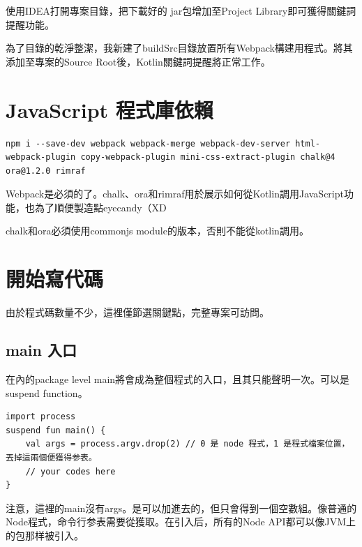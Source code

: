 使用IDEA打開專案目錄，把下載好的 jar包增加至Project Library即可獲得關鍵詞提醒功能。

為了目錄的乾淨整潔，我新建了buildSrc目錄放置所有Webpack構建用程式。將其添加至專案的Source Root後，Kotlin關鍵詞提醒將正常工作。







\section*{JavaScript 程式庫依賴}

\begin{lstlisting}
npm i --save-dev webpack webpack-merge webpack-dev-server html-webpack-plugin copy-webpack-plugin mini-css-extract-plugin chalk@4 ora@1.2.0 rimraf
\end{lstlisting}

Webpack是必須的了。chalk、ora和rimraf用於展示如何從Kotlin調用JavaScript功能，也為了順便製造點eyecandy（XD

chalk和ora必須使用commonjs module的版本，否則不能從kotlin調用。






\section*{開始寫代碼}

由於程式碼數量不少，這裡僅節選關鍵點，完整專案可訪問。

\subsection*{main 入口}

在內的package level main將會成為整個程式的入口，且其只能聲明一次。可以是suspend function。

\begin{lstlisting}
import process
suspend fun main() {
    val args = process.argv.drop(2) // 0 是 node 程式，1 是程式檔案位置，丟掉這兩個便獲得参表。
    // your codes here
}
\end{lstlisting}

注意，這裡的main沒有args。是可以加進去的，但只會得到一個空數組。像普通的Node程式，命令行参表需要從獲取。在引入后，所有的Node API都可以像JVM上的包那样被引入。

